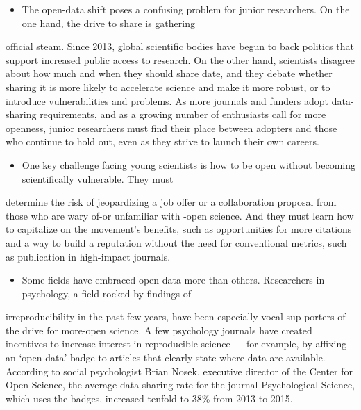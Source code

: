 \documentclass[UTF8,11pt]{ctexart}
\begin{document}
\begin{itemize}[leftmargin=2em,itemsep=.2em,topsep=.4em]\item[B.] The open-data shift poses a confusing problem for junior researchers. On the one hand, the drive to share is gathering
\end{itemize}

official steam. Since 2013, global scientific bodies have begun to back politics that support increased public access to research. On the other hand, scientists disagree about how much and when they should share date, and they debate whether sharing it is more likely to accelerate science and make it more robust, or to introduce vulnerabilities and problems. As more journals and funders adopt data-sharing requirements, and as a growing number of enthusiasts call for more openness, junior researchers must find their place between adopters and those who continue to hold out, even as they strive to launch their own careers.


\begin{itemize}[leftmargin=2em,itemsep=.2em,topsep=.4em]\item[C.] One key challenge facing young scientists is how to be open without becoming scientifically vulnerable. They must
\end{itemize}

determine the risk of jeopardizing a job offer or a collaboration proposal from those who are wary of-or unfamiliar with -open science. And they must learn how to capitalize on the movement's benefits, such as opportunities for more citations and a way to build a reputation without the need for conventional metrics, such as publication in high-impact journals.


\begin{itemize}[leftmargin=2em,itemsep=.2em,topsep=.4em]\item[D.] Some fields have embraced open data more than others. Researchers in psychology, a field rocked by findings of
\end{itemize}

irreproducibility in the past few years, have been especially vocal sup-porters of the drive for more-open science. A few psychology journals have created incentives to increase interest in reproducible science — for example, by affixing an ‘open-data’ badge to articles that clearly state where data are available. According to social psychologist Brian Nosek, executive director of the Center for Open Science, the average data-sharing rate for the journal Psychological Science, which uses the badges, increased tenfold to 38\% from 2013 to 2015.
\end{document}
